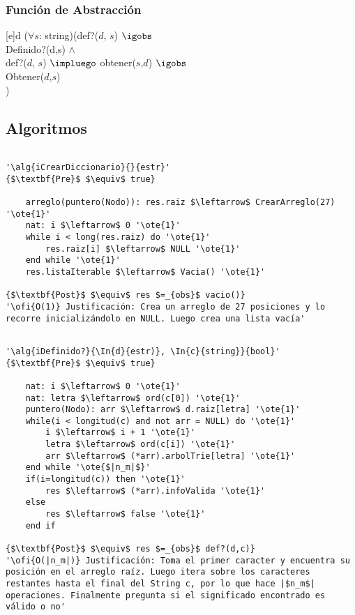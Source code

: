 
\pagebreak

\subsubsection{Funci\'on de Abstracci\'on}

[e]{d}{
($\forall s$: string)(def?($d$, $s$) $\igobs$ \\ Definido?(d,s)
\- $\land$ \\
\- def?($d$, $s$) $\impluego$ obtener($s$,$d$) $\igobs$ \\
\- Obtener($d$,$s$) \\
)
}

\subsection{Algoritmos}

\lstset{style=alg}

\begin{lstlisting}[mathescape]

'\alg{iCrearDiccionario}{}{estr}'
{$\textbf{Pre}$ $\equiv$ true}
	
    arreglo(puntero(Nodo)): res.raiz $\leftarrow$ CrearArreglo(27) '\ote{1}'
	nat: i $\leftarrow$ 0 '\ote{1}' 
    while i < long(res.raiz) do '\ote{1}'
    	res.raiz[i] $\leftarrow$ NULL '\ote{1}'
    end while '\ote{1}'
    res.listaIterable $\leftarrow$ Vacia() '\ote{1}'

{$\textbf{Post}$ $\equiv$ res $=_{obs}$ vacio()}
'\ofi{O(1)} Justificación: Crea un arreglo de 27 posiciones y lo recorre inicializándolo en NULL. Luego crea una lista vacía'

\end{lstlisting}

\begin{lstlisting}[mathescape]

'\alg{iDefinido?}{\In{d}{estr)}, \In{c}{string}}{bool}'
{$\textbf{Pre}$ $\equiv$ true}

	nat: i $\leftarrow$ 0 '\ote{1}'
	nat: letra $\leftarrow$ ord(c[0]) '\ote{1}'
	puntero(Nodo): arr $\leftarrow$ d.raiz[letra] '\ote{1}'
	while(i < longitud(c) and not arr = NULL) do '\ote{1}'
		i $\leftarrow$ i + 1 '\ote{1}'
		letra $\leftarrow$ ord(c[i]) '\ote{1}'
		arr $\leftarrow$ (*arr).arbolTrie[letra] '\ote{1}'
	end while '\ote{$|n_m|$}'
	if(i=longitud(c)) then '\ote{1}'
		res $\leftarrow$ (*arr).infoValida '\ote{1}'
	else
		res $\leftarrow$ false '\ote{1}'
	end if

{$\textbf{Post}$ $\equiv$ res $=_{obs}$ def?(d,c)}	
'\ofi{O(|n_m|)} Justificación: Toma el primer caracter y encuentra su posición en el arreglo raíz. Luego itera sobre los caracteres restantes hasta el final del String c, por lo que hace |$n_m$| operaciones. Finalmente pregunta si el significado encontrado es válido o no'

\end{lstlisting}

